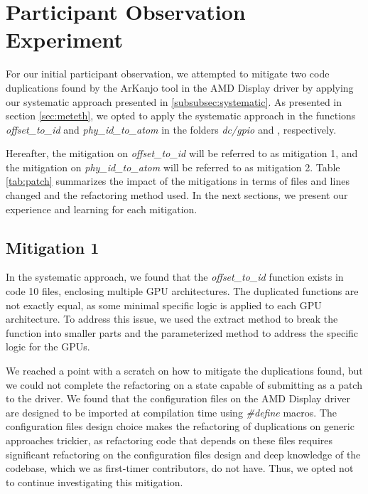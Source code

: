 \en

\section{Participant Observation Experiment}

For our initial participant observation, we attempted to mitigate two code 
duplications found by the ArKanjo tool in the AMD Display driver by applying 
our systematic approach presented in \ref{subsubsec:systematic}. 
As presented in section \ref{sec:meteth},
we opted to apply the systematic approach in the functions
\textit{offset\_to\_id} and \textit{phy\_id\_to\_atom} in the folders 
\textit{dc/gpio} and , respectively.

Hereafter, the mitigation on \textit{offset\_to\_id} will be referred to as mitigation 1, and the mitigation on 
\textit{phy\_id\_to\_atom} will be referred to as mitigation 2. 
Table \ref{tab:patch} summarizes the impact of the mitigations in terms of 
files and lines changed and the refactoring method used. In the next sections, 
we present our experience and learning for each mitigation.



\subsection{Mitigation 1}

In the systematic approach, we found that the \textit{offset\_to\_id} function 
exists in code 10 files, enclosing multiple GPU architectures. The duplicated 
functions are not exactly equal, as some minimal specific logic is applied to 
each GPU architecture. To address this issue, we used the extract method to 
break the function into smaller parts and the parameterized method to address 
the specific logic for the GPUs.

We reached a point with a scratch on how to mitigate the duplications found, 
but we could not complete the refactoring on a state capable of submitting as 
a patch to the driver. We found that the configuration files on the AMD Display 
driver are designed to be imported at compilation time using \textit{\#define} macros. 
The configuration files design choice makes the refactoring of duplications on 
generic approaches trickier, as refactoring code that depends on these files 
requires significant refactoring on the configuration files design and deep 
knowledge of the codebase, which we as first-timer contributors, do not have. 
Thus, we opted not to continue investigating this mitigation.

